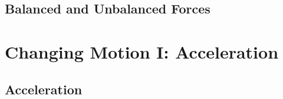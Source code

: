 \documentclass[dvipsnames]{article}
\newif\ifShowUnitIII
\begin{document}












\subsection{Balanced and Unbalanced Forces}

\fi

\clearpage

\section{Changing Motion I: Acceleration}

\ifShowUnitIII
\setcounter{example}{0}

\subsection{Acceleration}
\end{document}
